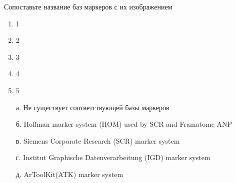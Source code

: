 
Сопоставьте название баз маркеров с их изображением


\begin{enumerate}
    \item 1
    \item 2
    \item 3
    \item 4
    \item 5
\end{enumerate}

\begin{enumerate}
    \item[а.] Не существует соответствующей базы маркеров
    \item[б.] Hoffman marker system (HOM) used by SCR and Framatome ANP
    \item[в.] Siemens Corporate Research (SCR) marker system
    \item[г.] Institut Graphische Datenverarbeitung (IGD) marker system
    \item[д.] ArToolKit(ATK) marker system 
\end{enumerate}

